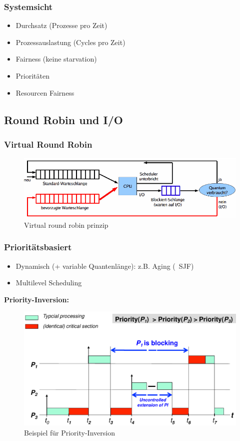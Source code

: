 \subsubsection{Systemsicht}
\begin{itemize}
    \item Durchsatz (Prozesse pro Zeit)
    \item Prozessauslastung (Cycles pro Zeit)
    \item Fairness (keine starvation)
    \item Prioritäten
    \item Resourcen Fairness
\end{itemize}

\subsection{Round Robin und I/O}
\subsubsection{Virtual Round Robin}
\begin{figure}[ht!]
    \includegraphics[scale=.4]{pics/virtual_round_robin}
    \caption{Virtual round robin prinzip}
\end{figure}

\subsubsection{Prioritätsbasiert}
\begin{itemize}
    \item Dynamisch (+ variable Quantenlänge): z.B. Aging (~SJF)
    \item Multilevel Scheduling
\end{itemize}

\textbf{Priority-Inversion:}
\begin{figure}[ht!]
    \includegraphics[scale=.3]{pics/priority_inversion}
    \caption{Beispiel für Priority-Inversion}
\end{figure}

